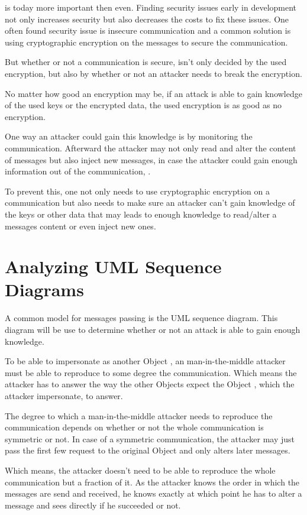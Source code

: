 \documentclass[12pt,journal,compsoc]{IEEEtran}
\newcommand{\Peer}[0]{Object }
\newcommand{\Peers}[0]{Objects }
\newcommand{\MITMA}[0]{man-in-the-middle attacker }
\newcommand{\linesep}[0]{\newline}
\begin{document}
 is today more important then even. Finding security issues early in development 
not only increases security but also decreases the costs to fix these issues. One often 
found security issue is insecure communication and a common solution is using 
cryptographic encryption on the messages to secure the communication. 
\linesep

But whether or not a communication is secure, isn't only decided by the used encryption, 
but also by whether or not an attacker needs to break the encryption. 
\linesep

No matter how good an encryption may be, if an attack is able to gain knowledge 
of the used keys or the encrypted data, the used encryption is as good as no encryption.
\linesep

One way an attacker could gain this knowledge is by monitoring the communication. 
Afterward the attacker may not only read and alter the content of messages but also inject new messages,
in case the attacker could gain enough information out of the communication, . 
\linesep

To prevent this, one not only needs to use cryptographic encryption on a communication but also 
needs to make sure an attacker can't gain knowledge of the keys or other data 
that may leads to enough knowledge to read/alter a messages content or even inject new ones.

\section{Analyzing UML Sequence Diagrams}

A common model for messages passing is the UML sequence diagram. This diagram will be use 
to determine whether or not an attack is able to gain enough knowledge.
\linesep

To be able to impersonate as another \Peer , an \MITMA must be able to reproduce to some degree  
the communication. Which means the attacker has to answer the way the other \Peers expect
the \Peer, which the attacker impersonate, to answer.
\linesep

The degree to which a \MITMA needs to reproduce the communication depends on whether or not 
the whole communication is symmetric or not. In case of a symmetric communication, the attacker 
may just pass the first few request to the original \Peer and only alters later messages.
\linesep

Which means, the attacker doesn't need to be able to reproduce the whole communication but 
a fraction of it. As the attacker knows the order in which the messages are send and received, he knows 
exactly at which point he has to alter a message and sees directly if he succeeded or not.
\linesep
\end{document}
